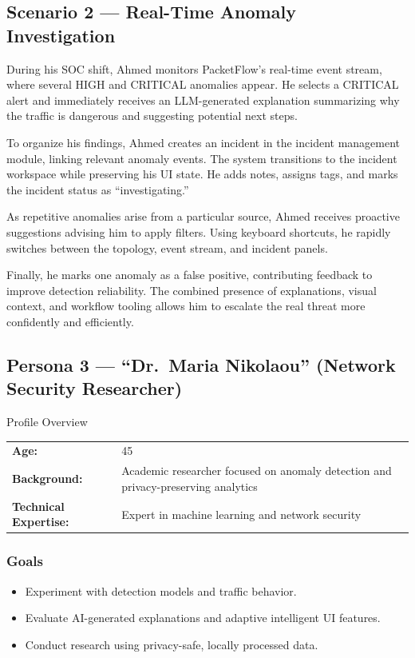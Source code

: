 \documentclass[
    11pt, 
    a4paper, 
    parskip=half, 
    headsepline,       %
    DIV=12             %
]{scrartcl}
\begin{document}
\subsection*{Scenario 2 --- Real-Time Anomaly Investigation}
During his SOC shift, Ahmed monitors PacketFlow’s real-time event stream, where several HIGH and CRITICAL anomalies appear. He selects a CRITICAL alert and immediately receives an LLM-generated explanation summarizing why the traffic is dangerous and suggesting potential next steps.

To organize his findings, Ahmed creates an incident in the incident management module, linking relevant anomaly events. The system transitions to the incident workspace while preserving his UI state. He adds notes, assigns tags, and marks the incident status as ``investigating.''

As repetitive anomalies arise from a particular source, Ahmed receives proactive suggestions advising him to apply filters. Using keyboard shortcuts, he rapidly switches between the topology, event stream, and incident panels.

Finally, he marks one anomaly as a false positive, contributing feedback to improve detection reliability. The combined presence of explanations, visual context, and workflow tooling allows him to escalate the real threat more confidently and efficiently.

\vspace{1cm} %

\subsection{Persona 3 --- ``Dr.\ Maria Nikolaou'' (Network Security Researcher)}

\begin{personabox}{Profile Overview}
    \begin{tabularx}{\linewidth}{@{}lX@{}}
        \textbf{Age:} & 45 \\
        \textbf{Background:} & Academic researcher focused on anomaly detection and privacy-preserving analytics \\
        \textbf{Technical Expertise:} & Expert in machine learning and network security
    \end{tabularx}
\end{personabox}

\subsubsection*{Goals}
\begin{itemize}
    \item Experiment with detection models and traffic behavior.
    \item Evaluate AI-generated explanations and adaptive intelligent UI features.
    \item Conduct research using privacy-safe, locally processed data.
\end{itemize}
\end{document}
